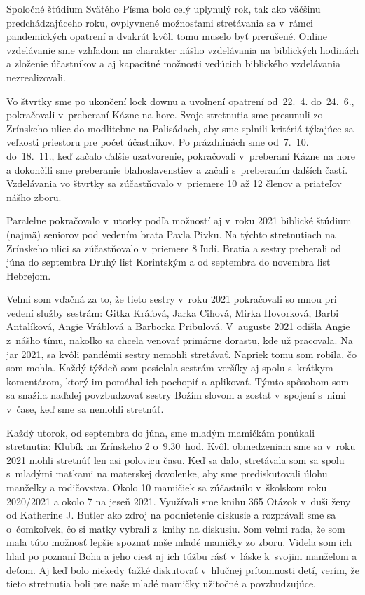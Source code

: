 Spoločné štúdium Svätého Písma bolo celý uplynulý rok, tak ako väčšinu predchádzajúceho roku, ovplyvnené možnosťami stretávania sa v~rámci pandemických opatrení a dvakrát kvôli tomu muselo byť prerušené. Online vzdelávanie sme vzhľadom na charakter nášho vzdelávania na biblických hodinách a zloženie účastníkov a aj kapacitné možnosti vedúcich biblického vzdelávania nezrealizovali.

Vo štvrtky sme po ukončení lock downu a uvoľnení opatrení od~22.~4. do~24.~6., pokračovali v~preberaní Kázne na hore. Svoje stretnutia sme presunuli zo Zrínskeho ulice do modlitebne na Palisádach, aby sme splnili kritériá týkajúce sa veľkosti priestoru pre počet účastníkov. Po prázdninách sme od~7.~10. do~18.~11., keď začalo ďalšie uzatvorenie, pokračovali v~preberaní Kázne na hore a dokončili sme preberanie blahoslavenstiev a začali s~preberaním ďalších častí. Vzdelávania vo štvrtky sa zúčastňovalo v~priemere 10 až 12 členov a priateľov nášho zboru.

Paralelne pokračovalo v~utorky podľa možností aj v~roku 2021 biblické štúdium (najmä) seniorov pod vedením brata Pavla Pivku. Na týchto stretnutiach na Zrínskeho ulici sa zúčastňovalo v~priemere 8 ľudí. Bratia a sestry preberali od júna do septembra Druhý list Korintským a od septembra do novembra list Hebrejom.



Veľmi som vďačná za to, že tieto sestry v~roku 2021 pokračovali so mnou pri vedení služby sestrám: Gitka Kráľová, Jarka Cihová, Mirka Hovorková, Barbi Antalíková, Angie Vráblová a Barborka Pribulová. V~auguste 2021 odišla Angie z~nášho tímu, nakoľko sa chcela venovať primárne dorastu, kde už pracovala.
Na jar 2021, sa kvôli pandémii sestry nemohli stretávať. Napriek tomu som robila, čo som mohla. Každý týždeň som posielala sestrám veršíky aj spolu s~krátkym komentárom, ktorý im pomáhal ich pochopiť a aplikovať. Týmto spôsobom som sa snažila naďalej povzbudzovať sestry Božím slovom a zostať v~spojení s~nimi v~čase, keď sme sa nemohli stretnúť.

Každý utorok, od septembra do júna, sme mladým mamičkám ponúkali stretnutia: Klubík na Zrínskeho 2 o~9.30~hod. Kvôli obmedzeniam sme sa v~roku 2021 mohli stretnúť len asi polovicu času. Keď sa dalo, stretávala som sa spolu s~mladými matkami na materskej dovolenke, aby sme prediskutovali úlohu manželky a rodičovstva. Okolo 10 mamičiek sa zúčastnilo v~školskom roku 2020/2021 a okolo 7 na jeseň 2021. Využívali sme knihu 365 Otázok v~duši ženy od Katherine J. Butler ako zdroj na podnietenie diskusie a rozprávali sme sa o~čomkoľvek, čo si matky vybrali z~knihy na diskusiu. Som veľmi rada, že som mala túto možnosť lepšie spoznať naše mladé mamičky zo zboru. Videla som ich hlad po poznaní Boha a jeho ciest aj ich túžbu rásť v~láske k~svojim manželom a deťom. Aj keď bolo niekedy ťažké diskutovať v~hlučnej prítomnosti detí, verím, že tieto stretnutia boli pre naše mladé mamičky užitočné a povzbudzujúce.

